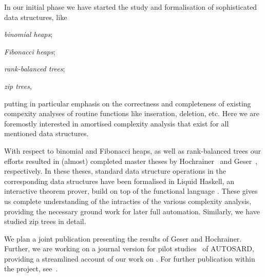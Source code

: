 \documentclass[10pt,a4paper]{article}
\begin{document}
In our initial phase we have started the study and formalisation of sophisticated data structures, like
%
\begin{inparaenum}[(i)]
\item \emph{binomial heaps};
\item \emph{Fibonacci heaps};
\item \emph{rank-balanced trees};
\item \emph{zip trees},
\end{inparaenum}
%
putting in particular emphasis on the correctness and completeness of existing compexity analyses of routine functions
like inseration, deletion, etc. Here we are foremostly interested in amortised complexity analysis that exist for all mentioned
data structures.

With respect to binomial and Fibonacci heaps, as well as rank-balanced trees our efforts resulted in (almost) completed master theses by
Hochrainer~\cite{Hochrainer:2024} and Geser~\cite{Geser:2024}, respectively. In these theses, standard data structure operations in
the corresponding data structures have been formalised in Liquid Haskell, an interactive theorem prover, build on top of the functional
language \Haskell. These gives us complete understanding of the intracties of the various complexity analysis, providing the necessary
ground work for later full automation. Similarly, we have studied zip trees in detail.

We plan a joint publication presenting the results of Geser and Hochrainer. Further, we are working on a journal version for pilot
studies~\cite{LMZ:2021,LMZ:2022} of AUTOSARD, providing a streamlined account of our work on \atlas.
%
For further publication within the project, see~\cite{AvanziniMS23,ParsertP24}.


\small

\end{document}
